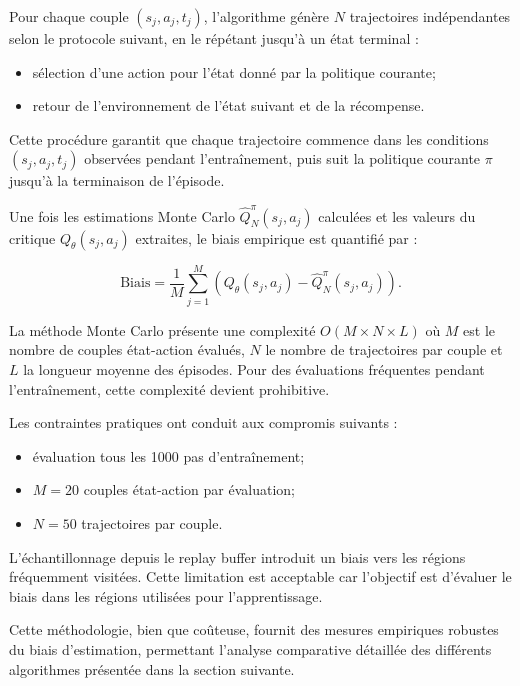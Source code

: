 \documentclass[a4paper, 12pt]{report}
\begin{document}
    Pour chaque couple $(s_j, a_j, t_j)$, l'algorithme génère $N$ trajectoires
    indépendantes selon le protocole suivant, en le répétant jusqu'à un état
    terminal :

    \begin{itemize}
      \item sélection d'une action pour l'état donné par la politique courante;
      \item retour de l'environnement de l'état suivant et de la récompense.
    \end{itemize}

    Cette procédure garantit que chaque trajectoire commence dans les
    conditions $(s_j, a_j, t_j)$ observées pendant l'entraînement, puis suit la
    politique courante $\pi$ jusqu'à la terminaison de l'épisode.

    Une fois les estimations Monte Carlo $\hat{Q}^\pi_N(s_j, a_j)$ calculées et
    les valeurs du critique $Q_\theta(s_j, a_j)$ extraites, le biais empirique
    est quantifié par :

    $$
    \text{Biais} = \frac{1}{M} \sum_{j=1}^M (Q_\theta(s_j, a_j) - \hat{Q}^\pi_N(s_j, a_j)).
    $$

    La méthode Monte Carlo présente une complexité $O(M \times N \times L)$ où
    $M$ est le nombre de couples état-action évalués, $N$ le nombre de
    trajectoires par couple et $L$ la longueur moyenne des épisodes. Pour des
    évaluations fréquentes pendant l'entraînement, cette complexité devient
    prohibitive.

    Les contraintes pratiques ont conduit aux compromis suivants :

    \begin{itemize}
      \item évaluation tous les 1000 pas d'entraînement;
      \item $M = 20$ couples état-action par évaluation;
      \item $N = 50$ trajectoires par couple.
    \end{itemize}

    L'échantillonnage depuis le replay buffer introduit un biais vers les
    régions fréquemment visitées. Cette limitation est acceptable car
    l'objectif est d'évaluer le biais dans les régions utilisées pour
    l'apprentissage.

    Cette méthodologie, bien que coûteuse, fournit des mesures empiriques
    robustes du biais d'estimation, permettant l'analyse comparative détaillée
    des différents algorithmes présentée dans la section suivante.
\end{document}
